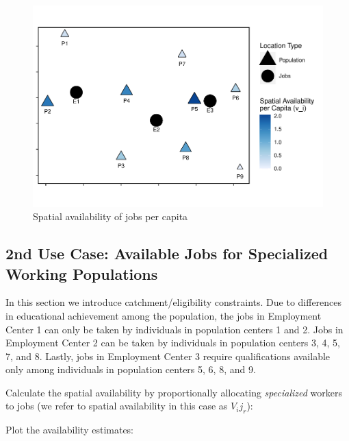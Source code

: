 \documentclass[]{elsarticle} %
\begin{document}
\begin{figure}
\includegraphics[width=1\linewidth]{Spatial-Availability_files/figure-latex/toy-example-availability-jobs-per-capita-1} \caption{\label{fig:toy-example-availability-jobs-per-capita}Spatial availability of jobs per capita}\label{fig:toy-example-availability-jobs-per-capita}
\end{figure}

\hypertarget{nd-use-case-available-jobs-for-specialized-working-populations}{%
\subsection{2nd Use Case: Available Jobs for Specialized Working
Populations}\label{nd-use-case-available-jobs-for-specialized-working-populations}}

In this section we introduce catchment/eligibility constraints. Due to
differences in educational achievement among the population, the jobs in
Employment Center 1 can only be taken by individuals in population
centers 1 and 2. Jobs in Employment Center 2 can be taken by individuals
in population centers 3, 4, 5, 7, and 8. Lastly, jobs in Employment
Center 3 require qualifications available only among individuals in
population centers 5, 6, 8, and 9.

Calculate the spatial availability by proportionally allocating
\emph{specialized} workers to jobs (we refer to spatial availability in
this case as \(V_ij_r\)):

Plot the availability estimates:
\end{document}
